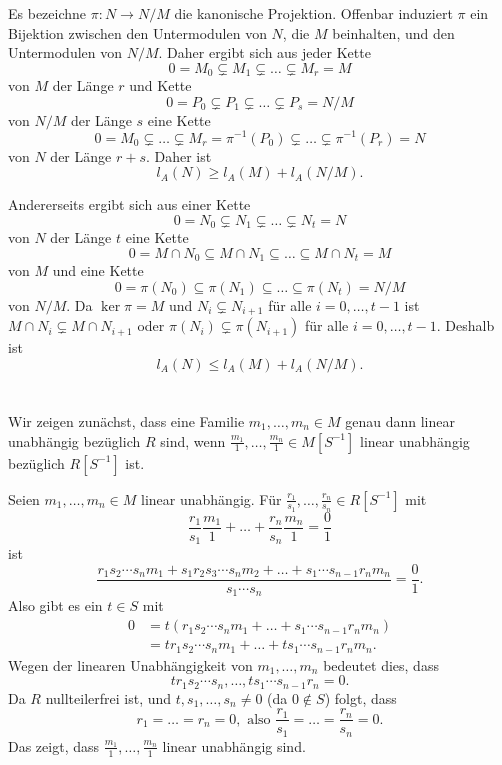 \documentclass[a4paper,10pt]{article}
\theoremstyle{definition}
\begin{document}
Es bezeichne $\pi : N \rightarrow N/M$ die kanonische Projektion. Offenbar induziert $\pi$ ein Bijektion zwischen den Untermodulen von $N$, die $M$ beinhalten, und den Untermodulen von $N/M$. Daher ergibt sich aus jeder Kette
\[
 0 = M_0 \subsetneq M_1 \subsetneq \ldots \subsetneq M_r = M
\]
von $M$ der Länge $r$ und Kette
\[
 0 = P_0 \subsetneq P_1 \subsetneq \ldots \subsetneq P_s = N/M
\]
von $N/M$ der Länge $s$ eine Kette
\[
 0 = M_0 \subsetneq \ldots \subsetneq M_r = \pi^{-1}(P_0) \subsetneq \ldots \subsetneq \pi^{-1}(P_r) = N
\]
von $N$ der Länge $r+s$. Daher ist
\[
 l_A(N) \geq l_A(M) + l_A(N/M).
\]

Andererseits ergibt sich aus einer Kette
\[
 0 = N_0 \subsetneq N_1 \subsetneq \ldots \subsetneq N_t = N
\]
von $N$ der Länge $t$ eine Kette
\[
 0 = M \cap N_0 \subseteq M \cap N_1 \subseteq \ldots \subseteq M \cap N_t = M
\]
von $M$ und eine Kette
\[
 0 = \pi(N_0) \subseteq \pi(N_1) \subseteq \ldots \subseteq \pi(N_t) = N/M
\]
von $N/M$. Da $\ker \pi = M$ und $N_i \subsetneq N_{i+1}$ für alle $i=0, \ldots, t-1$ ist $M \cap N_i \subsetneq M \cap N_{i+1}$ oder $\pi(N_i) \subsetneq \pi(N_{i+1})$ für alle $i=0, \ldots, t-1$. Deshalb ist
\[
 l_A(N) \leq l_A(M) + l_A(N/M).
\]





\section{}
Wir zeigen zunächst, dass eine Familie $m_1, \ldots, m_n \in M$ genau dann linear unabhängig bezüglich $R$ sind, wenn $\frac{m_1}{1}, \ldots, \frac{m_n}{1} \in M[S^{-1}]$ linear unabhängig bezüglich $R[S^{-1}]$ ist.

Seien $m_1, \ldots, m_n \in M$ linear unabhängig. Für $\frac{r_1}{s_1}, \ldots, \frac{r_n}{s_n} \in R[S^{-1}]$ mit
\[
 \frac{r_1}{s_1} \frac{m_1}{1} + \ldots + \frac{r_n}{s_n} \frac{m_n}{1} = \frac{0}{1}
\]
ist
\[
 \frac{r_1 s_2 \cdots s_n m_1 + s_1 r_2 s_3 \cdots s_n m_2 + \ldots + s_1 \cdots s_{n-1} r_n m_n}{s_1 \cdots s_n} = \frac{0}{1}.
\]
Also gibt es ein $t \in S$ mit
\begin{align*}
 0
 &= t(r_1 s_2 \cdots s_n m_1+ \ldots + s_1 \cdots s_{n-1} r_n m_n) \\
 &= tr_1 s_2 \cdots s_n m_1+ \ldots + t s_1 \cdots s_{n-1} r_n m_n.
\end{align*}
Wegen der linearen Unabhängigkeit von $m_1, \ldots, m_n$ bedeutet dies, dass
\[
 t r_1 s_2 \cdots s_n, \ldots, t s_1 \cdots s_{n-1} r_n = 0.
\]
Da $R$ nullteilerfrei ist, und $t, s_1, \ldots, s_n \neq 0$ (da $0 \not\in S$) folgt, dass
\[
 r_1 = \ldots = r_n = 0, \text{ also } \frac{r_1}{s_1} = \ldots = \frac{r_n}{s_n} = 0.
\]
Das zeigt, dass $\frac{m_1}{1}, \ldots, \frac{m_n}{1}$ linear unabhängig sind.
\end{document}
